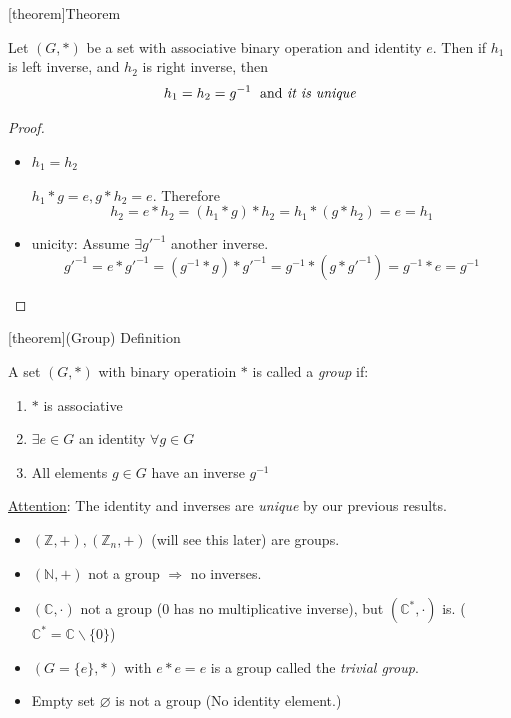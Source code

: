 \documentclass[12pt]{report}
\theoremstyle{definition}
\begin{document}
[theorem]{Theorem}
\begin{equal left right inverse}
    Let $(G, *)$ be a set with associative binary operation and identity $e$.
    Then if $h_1$ is left inverse, and $h_2$ is right inverse, then\[
        h_1 = h_2 = g^{-1} \;\textnormal{ and \emph{it is unique}}
    \]
\end{equal left right inverse}

\begin{proof}
    \;

    \begin{itemize}
            \item $h_1 = h_2$

                $h_1 * g = e, g * h_2 = e$. Therefore\[
                    h_2 = e * h_2 = (h_1 * g) * h_2 = h_1 * (g * h_2) = e = h_1
                \]
            \item unicity: Assume $\exists g'^{-1}$ another inverse.\[
                    g'^{-1} = e * g'^{-1} = (g^{-1} * g) * g'^{-1} 
                    = g^{-1} * (g * g'^{-1}) = g^{-1} * e = g^{-1}
            \]
    \end{itemize}
\end{proof}

[theorem]{(Group) Definition}
\begin{Group Definition}
    A set $(G,*)$ with binary operatioin $*$ is called a \emph{group} if:
    \begin{enumerate}[label = (\arabic*)]
        \item $*$ is associative
        \item $\exists e \in G$ an identity $\forall g \in G$
        \item All elements $g \in G$ have an inverse $g^{-1}$
    \end{enumerate}
    \underline{Attention}: The identity and inverses are \emph{unique} by our previous results.
    
\end{Group Definition}

\begin{ex}
    \;

    \begin{itemize}
        \item $(\mathbb{Z}, +), (\mathbb{Z}_n, +)$ (will see this later) are groups.
        \item $(\mathbb{N}, +)$ not a group $\Rightarrow$ no inverses.
        \item $(\mathbb{C}, \cdot)$ not a group (0 has no multiplicative inverse),
            but $(\mathbb{C}^{*}, \cdot)$ is. ($\mathbb{C}^{*} = \mathbb{C}\backslash \{0\}$)
        \item $(G = \{e\}, *)$ with $e * e = e$ is a group called the \emph{trivial group}.
        \item Empty set $\varnothing$ is not a group (No identity element.)
    \end{itemize}
    
\end{ex}
\end{document}
